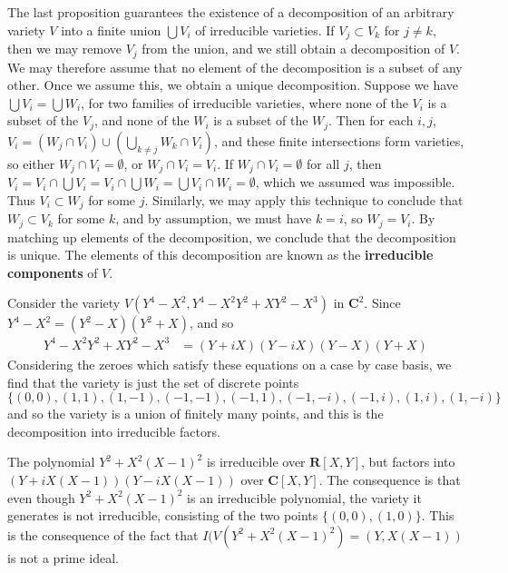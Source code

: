 The last proposition guarantees the existence of a decomposition of an arbitrary variety $V$ into a finite union $\bigcup V_i$ of irreducible varieties. If $V_j \subset V_k$ for $j \neq k$, then we may remove $V_j$ from the union, and we still obtain a decomposition of $V$. We may therefore assume that no element of the decomposition is a subset of any other. Once we assume this, we obtain a unique decomposition. Suppose we have $\bigcup V_i = \bigcup W_i$, for two families of irreducible varieties, where none of the $V_i$ is a subset of the $V_j$, and none of the $W_i$ is a subset of the $W_j$. Then for each $i,j$, $V_i = (W_j \cap V_i) \cup (\bigcup_{k \neq j} W_k \cap V_i)$, and these finite intersections form varieties, so either $W_j \cap V_i = \emptyset$, or $W_j \cap V_i = V_i$. If $W_j \cap V_i = \emptyset$ for all $j$, then $V_i = V_i \cap \bigcup V_i = V_i \cap \bigcup W_i = \bigcup V_i \cap W_i = \emptyset$, which we assumed was impossible. Thus $V_i \subset W_j$ for some $j$. Similarly, we may apply this technique to conclude that $W_j \subset V_k$ for some $k$, and by assumption, we must have $k = i$, so $W_j = V_i$. By matching up elements of the decomposition, we conclude that the decomposition is unique. The elements of this decomposition are known as the {\bf irreducible components} of $V$.

\begin{example}
    Consider the variety $V(Y^4 - X^2, Y^4 - X^2Y^2 + XY^2 - X^3)$ in $\mathbf{C}^2$. Since $Y^4 - X^2 = (Y^2 - X)(Y^2 + X)$, and so
    \begin{align*}
        Y^4 - X^2Y^2 + XY^2 - X^3 &= (Y + iX)(Y - iX)(Y-X)(Y+X)
    \end{align*}
    Considering the zeroes which satisfy these equations on a case by case basis, we find that the variety is just the set of discrete points
    \[ \{ (0,0), (1,1), (1,-1), (-1,-1), (-1,1), (-1,-i), (-1,i), (1,i), (1,-i) \} \]
    and so the variety is a union of finitely many points, and this is the decomposition into irreducible factors.
\end{example}

\begin{example}
    The polynomial $Y^2 + X^2(X-1)^2$ is irreducible over $\mathbf{R}[X,Y]$, but factors into $(Y + iX(X-1))(Y - iX(X-1))$ over $\mathbf{C}[X,Y]$. The consequence is that even though $Y^2 + X^2(X-1)^2$ is an irreducible polynomial, the variety it generates is not irreducible, consisting of the two points $\{ (0,0), (1,0) \}$. This is the consequence of the fact that $I(V(Y^2 + X^2(X-1)^2) = (Y,X(X-1))$ is not a prime ideal.
\end{example}

